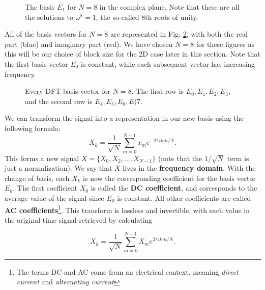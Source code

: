 \begin{figure}
    \centering
    
    \caption{The basis $E_1$ for $N=8$ in the complex plane. Note that these are all the solutions to $\omega^8=1$, the so-called 8th roots of unity.}
    \label{fig:eulerid}
\end{figure}

All of the basis vectors for $N=8$ are represented in Fig. \ref{fig:DFTBasis}, with both the real part (blue) and imaginary part (red). We have chosen $N=8$ for these figures as this will be our choice of block size for the 2D case later in this section. Note that the first basis vector $E_0$ is constant, while each subsequent vector has increasing frequency.

\begin{figure}
    \centering
    \begin{minipage}{\textwidth}
        \centering
        
    \end{minipage}
    \caption{Every DFT basis vector for $N=8$. The first row is $E_0,E_1,E_2,E_3$, and the second row is $E_4,E_5,E_6,E)7$. }
    \label{fig:DFTBasis}
\end{figure}

We can transform the signal into a representation in our new basis using the following formula:
\begin{equation}
    X_k=\frac{1}{\sqrt{N}}\sum_{m=0}^{N-1}x_me^{-2\pi ikm/N}.\label{eq:dfttransform}
\end{equation}
This forms a new signal $X=\{X_0,X_2,\dots,X_{N-1}\}$ (note that the $1/\sqrt{N}$ term is just a normalization). We say that $X$ lives in the \textbf{frequency domain}. With the change of basis, each $X_k$ is now the corresponding coefficient for the basis vector $E_k$. The first coefficient $X_0$ is called the \textbf{DC coefficient}, and corresponds to the average value of the signal since $E_0$ is constant. All other coefficients are called \textbf{AC coefficients}\footnote{The terms DC and AC come from an electrical context, meaning \textit{direct current} and \textit{alternating current}}. This transform is lossless and invertible, with each value in the original time signal retrieved by calculating

\begin{equation}
    X_k=\frac{1}{\sqrt{N}}\sum_{m=0}^{N-1}X_me^{2\pi ikm/N}.\label{eq:idfttransform}
\end{equation}

